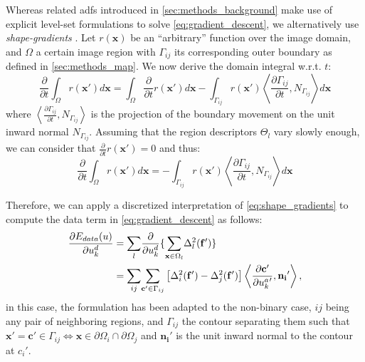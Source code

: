 Whereas related \glspl*{adf} introduced in \autoref{sec:methods_background}
make use of explicit level-set formulations to solve \eqref{eq:gradient_descent},
we alternatively use \emph{shape-gradients}
\cite{jehan-besson_dream2s:_2003,herbulot_segmentation_2006}.
Let $r(\mathbf{x})$ be an ``arbitrary'' function over the image domain,
and $\Omega$ a certain image region with $\Gamma_{ij}$ its corresponding
outer boundary as defined in \autoref{sec:methods_map}.
We now derive the domain integral w.r.t. $t$:
\begin{equation*}
\frac{\partial}{\partial t} \int_\Omega r(\mathbf{x}') d\mathbf{x} = \int_\Omega \frac{\partial}{\partial t}r(\mathbf{x}') d\mathbf{x} - \int_{\Gamma_{ij}} r(\mathbf{x}') \left\langle \frac{\partial \Gamma_{ij} }{\partial t}, N_{\Gamma_{ij}}\right\rangle d\mathbf{x}
\end{equation*}
where $\left\langle\frac{\partial\Gamma_{ij}}{\partial t}, N_{\Gamma_{ij}}\right\rangle$ is 
the projection of the boundary movement on the unit inward normal $N_{\Gamma_{ij}}$. Assuming
that the region descriptors $\Theta_l$ vary slowly enough, we can consider
that $\frac{\partial}{\partial t} r(\mathbf{x}') = 0$ and thus:
\begin{equation}
\frac{\partial}{\partial t} \int_\Omega r(\mathbf{x}') d\mathbf{x} = 
- \int_{\Gamma_{ij}} r(\mathbf{x}') \left\langle \frac{\partial \Gamma_{ij} }{\partial t}, N_{\Gamma_{ij}}\right\rangle d\mathbf{x}
\label{eq:shape_gradients}
\end{equation}

Therefore, we can apply a discretized interpretation of \eqref{eq:shape_gradients}
to compute the data term in \eqref{eq:gradient_descent} as follows:
\begin{align}
\frac{\partial E_{data}(u)}{\partial u^d_k} &=
\underset{l}{\sum} \frac{ \partial }{\partial u^d_k} \lbrace
 \underset{\mathbf{x} \in \Omega_l}{\sum}
\Delta^2_l (\mathbf{f}') \rbrace \notag\\
&= \underset{ij}{\sum} \underset{\mathbf{c}' \in \Gamma_{ij}}{\sum}
\left[ \Delta^2_i (\mathbf{f}' ) - \Delta^2_j (\mathbf{f}')\right]
\left\langle \frac{\partial \mathbf{c}'}{\partial {u^a_k}'}, \mathbf{n_i}'\right\rangle,
\label{eq:gradient_wshape}
\end{align}
in this case, the formulation has been adapted to the non-binary case, $ij$
being any pair of neighboring regions, and $\Gamma_{ij}$ the contour separating
them such that $\mathbf{x}' = \mathbf{c}' \in\Gamma_{ij} \iff \mathbf{x}\in \partial\Omega_i \cap \partial\Omega_j$
and $\mathbf{n_i}'$ is the unit inward normal to the contour at $c_i'$.

